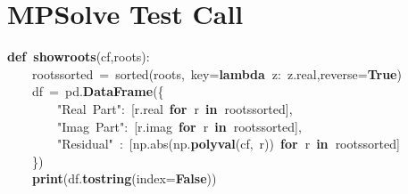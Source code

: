 \documentclass{article}\usepackage[]{graphicx}\usepackage[dvipsnames,table]{xcolor}
\makeatletter
\newcommand{\hlsng}[1]{\textcolor[rgb]{0.192,0.494,0.8}{#1}}%
\newcommand{\hlopt}[1]{\textcolor[rgb]{0,0,0}{#1}}%
\newcommand{\hldef}[1]{\textcolor[rgb]{0.345,0.345,0.345}{#1}}%
\newcommand{\hlkwa}[1]{\textcolor[rgb]{0.161,0.373,0.58}{\textbf{#1}}}%
\newcommand{\hlkwb}[1]{\textcolor[rgb]{0.69,0.353,0.396}{#1}}%
\newcommand{\hlkwd}[1]{\textcolor[rgb]{0.737,0.353,0.396}{\textbf{#1}}}%
\newenvironment{kframe}{%
 \def\at@end@of@kframe{}%
 \ifinner\ifhmode%
  \def\at@end@of@kframe{\end{minipage}}%
  \begin{minipage}{\columnwidth}%
 \fi\fi%
 \def\FrameCommand##1{\hskip\@totalleftmargin \hskip-\fboxsep
 \colorbox{shadecolor}{##1}\hskip-\fboxsep
     \hskip-\linewidth \hskip-\@totalleftmargin \hskip\columnwidth}%
 \MakeFramed {\advance\hsize-\width
   \@totalleftmargin\z@ \linewidth\hsize
   \@setminipage}}%
 {\par\unskip\endMakeFramed%
 \at@end@of@kframe}
\newenvironment{knitrout}{}{} %
\makeatother
\begin{document}
\section{MPSolve Test Call}
\begin{center}
\begin{minipage}[m]{18cm}
\begin{knitrout}\small
{}\color{fgcolor}\begin{kframe}
\noindent
\ttfamily
\hldef{}\hlkwa{def\ }\hldef{}\hlkwd{show\textunderscore roots}\hldef{}\hlopt{(}\hldef{cf}\hlopt{,}\hldef{roots}\hlopt{):}\hspace*{\fill}\\
\hldef{}\hldef{\ \ \ \ }\hldef{roots\textunderscore sorted\ }\hlopt{=\ }\hldef{}\hlkwb{sorted}\hldef{}\hlopt{(}\hldef{roots}\hlopt{,\ }\hldef{key}\hlopt{=}\hldef{}\hlkwa{lambda\ }\hldef{z}\hlopt{:\ }\hldef{z}\hlopt{.}\hldef{real}\hlopt{,}\hldef{reverse}\hlopt{=}\hldef{}\hlkwa{True}\hldef{}\hlopt{)}\hspace*{\fill}\\
\hldef{}\hldef{\ \ \ \ }\hldef{df\ }\hlopt{=\ }\hldef{pd}\hlopt{.}\hldef{}\hlkwd{DataFrame}\hldef{}\hlopt{(\{}\hspace*{\fill}\\
\hldef{}\hldef{\ \ \ \ \ \ \ \ }\hldef{}\hlsng{"Real\ Part"}\hldef{}\hlopt{:\ {[}}\hldef{r}\hlopt{.}\hldef{real\ }\hlkwa{for\ }\hldef{r\ }\hlkwa{in\ }\hldef{roots\textunderscore sorted}\hlopt{{]},}\hspace*{\fill}\\
\hldef{}\hldef{\ \ \ \ \ \ \ \ }\hldef{}\hlsng{"Imag\ Part"}\hldef{}\hlopt{:\ {[}}\hldef{r}\hlopt{.}\hldef{imag\ }\hlkwa{for\ }\hldef{r\ }\hlkwa{in\ }\hldef{roots\textunderscore sorted}\hlopt{{]},}\hspace*{\fill}\\
\hldef{}\hldef{\ \ \ \ \ \ \ \ }\hldef{}\hlsng{"Residual"}\hldef{\ }\hlopt{:\ {[}}\hldef{np}\hlopt{.}\hldef{}\hlkwb{abs}\hldef{}\hlopt{(}\hldef{np}\hlopt{.}\hldef{}\hlkwd{polyval}\hldef{}\hlopt{(}\hldef{cf}\hlopt{,\ }\hldef{r}\hlopt{))\ }\hldef{}\hlkwa{for\ }\hldef{r\ }\hlkwa{in\ }\hldef{roots\textunderscore sorted}\hlopt{{]}}\hspace*{\fill}\\
\hldef{}\hldef{\ \ \ \ }\hldef{}\hlopt{\})}\hspace*{\fill}\\
\hldef{}\hldef{\ \ \ \ }\hldef{}\hlkwa{print}\hldef{}\hlopt{(}\hldef{df}\hlopt{.}\hldef{}\hlkwd{to\textunderscore string}\hldef{}\hlopt{(}\hldef{index}\hlopt{=}\hldef{}\hlkwa{False}\hldef{}\hlopt{))}\hspace*{\fill}\\

\end{kframe}
\end{knitrout}
\end{minipage}
\end{center}
\end{document}
